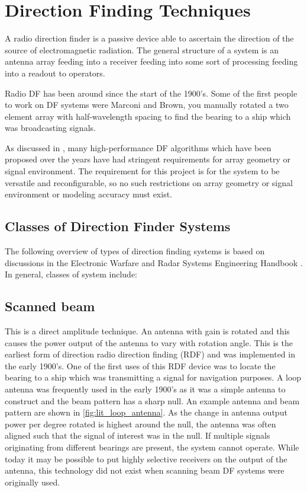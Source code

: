 \section{Direction Finding Techniques}
A radio direction finder is a passive device able to ascertain the direction of the source of electromagnetic radiation. 
The general structure of a system is an antenna array feeding into a receiver feeding into some sort of processing feeding into a readout to operators.

Radio DF has been around since the start of the 1900's. Some of the first people to work on DF  systems were Marconi and Brown, you manually rotated a two element array with half-wavelength spacing to find the bearing to a ship which was broadcasting signals. 

As discussed in \cite{farrier1990direction}, many high-performance DF algorithms which have been proposed over the years have had stringent requirements for array geometry or signal environment. The requirement for this project is for the system to be versatile and reconfigurable, so no such restrictions on array geometry or signal environment or modeling accuracy must exist. 

\subsection{Classes of Direction Finder Systems}
The following overview of types of direction finding systems is based on discussions in the Electronic Warfare and Radar Systems Engineering Handbook \cite{desk1997electronic}.
In general, classes of system include:

\subsection{Scanned beam}
This is a direct amplitude technique. An antenna with gain is rotated and this causes the power output of the antenna to vary with rotation angle. This is the earliest form of direction radio direction finding (RDF)  and was implemented in the early 1900's. One of the first uses of this RDF device was to locate the bearing to a ship which was transmitting a signal for navigation purposes. A loop antenna was frequently used in the early 1900's as it was a simple antenna to construct and the beam pattern has a sharp null. An example antenna and beam pattern are shown in \autoref{fig:lit_loop_antenna}. As the change in antenna output power per degree rotated is highest around the null, the antenna was often aligned such that the signal of interest was in the null. If multiple signals originating from different bearings are present, the system cannot operate. While today it may be possible to put highly selective receivers on the output of the antenna, this technology did not exist when scanning beam DF systems were originally used.

